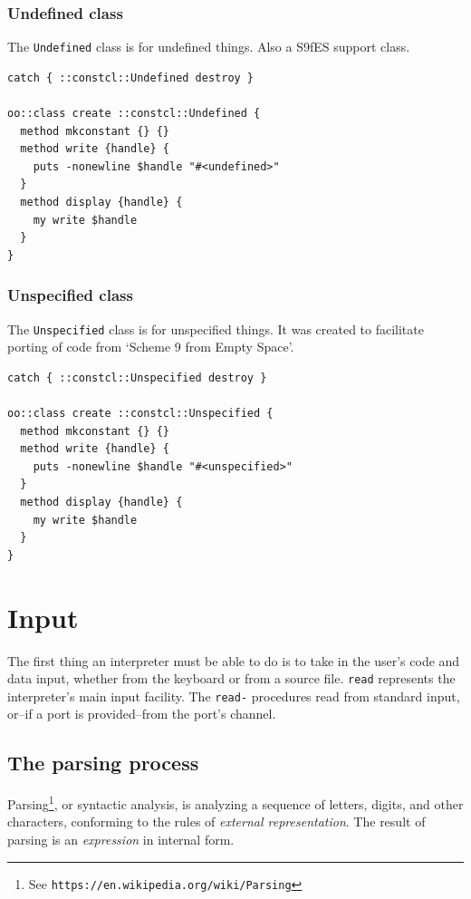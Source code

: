 \documentclass[twoside,9pt]{report}
\begin{document}
\subsection{Undefined class}
\label{undefined-class}


The \texttt{Undefined} class is for undefined things. Also a S9fES support class.

\begin{lstlisting}
catch { ::constcl::Undefined destroy }
 
oo::class create ::constcl::Undefined {
  method mkconstant {} {}
  method write {handle} {
    puts -nonewline $handle "#<undefined>"
  }
  method display {handle} {
    my write $handle
  }
}
\end{lstlisting}
\subsection{Unspecified class}
\label{unspecified-class}


The \texttt{Unspecified} class is for unspecified things. It was created to facilitate porting of code from `Scheme 9 from Empty Space'.

\begin{lstlisting}
catch { ::constcl::Unspecified destroy }
 
oo::class create ::constcl::Unspecified {
  method mkconstant {} {}
  method write {handle} {
    puts -nonewline $handle "#<unspecified>"
  }
  method display {handle} {
    my write $handle
  }
}
\end{lstlisting}
\chapter{Input}
\label{input}


The first thing an interpreter must be able to do is to take in the user's code and data input, whether from the keyboard or from a source file. \texttt{read} represents the interpreter's main input facility. The \texttt{read-} procedures read from standard input, or--if a port is provided--from the port's channel.

\section{The parsing process}
\label{the-parsing-process}


Parsing\footnote{See \texttt{https://en.wikipedia.org/wiki/Parsing}}, or syntactic analysis, is analyzing a sequence of letters, digits, and other characters, conforming to the rules of \emph{external representation}. The result of parsing is an \emph{expression} in internal form.
\end{document}
